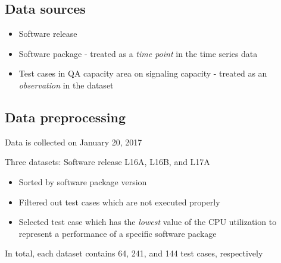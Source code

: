 \documentclass{beamer}
\begin{document}
\subsection{Data sources}
\begin{frame}[fragile]

\begin{itemize}
\item Software release
\item Software package - treated as a \textit{time point} in the time series data
\item Test cases \footnotesize{in QA capacity area on signaling capacity} \normalsize{- treated as an \textit{observation} in the dataset}


\end{itemize}

\end{frame}


\subsection{Data preprocessing}
\begin{frame}
Data is collected on January 20, 2017

Three datasets: Software release L16A, L16B, and L17A
\begin{itemize}
\item Sorted by software package version
\item Filtered out test cases which are not executed properly
\item Selected test case which has the \textit{lowest} value of the CPU utilization to represent a performance of a specific software package
\end{itemize}

In total, each dataset contains 64, 241, and 144 test cases, respectively

\end{frame}
\end{document}
